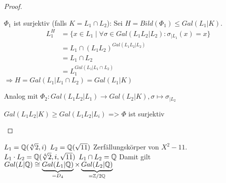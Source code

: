 \documentclass[../main.tex]{subfiles}
\begin{document}
\begin{proof}
\begin{description}
        $\Phi_1$ ist surjektiv (falls $K = L_1 \cap L_2$):
        Sei $H=Bild(\Phi_1)\leq Gal(L_1|K)$.
        \begin{align*}
            L_1^H&=\{x\in L_1\mid\forall \sigma\in Gal(L_1L_2|L_2)\colon \sigma_{|L_1}(x) = x\}\\
            &= L_1\cap (L_1L_2)^{Gal(L_1L_2|L_2)}\\
            &= L_1\cap L_2\\
            &= L_1^{Gal(L_1|L_1\cap L_2)}
        \end{align*}
         $\Rightarrow H= Gal(L_1|L_1\cap L_2) = Gal(L_1|K)$
    
        Analog mit $\Phi_2: Gal(L_1L_2|L_1)\rightarrow Gal(L_2|K), \sigma \mapsto \sigma_{|L_2}$
    
        $Gal(L_1L_2|K)\geq Gal(L_1L_2|L_i)$ => $\Phi$ ist surjektiv
    \end{description}
\end{proof}
\begin{example}
    $L_1=\mathbb{Q}(\sqrt[4]{2},i)$
    $L_2=\mathbb{Q}(\sqrt{11})$ Zerfällungskörper von $X^2-11$.
    $L_1\cdot L_2 = \mathbb{Q}(\sqrt[4]{2},i,\sqrt{11})$
    $L_1\cap L_2 = \mathbb{Q}$
    Damit gilt $Gal(L|\mathbb{Q})\cong \underbrace{Gal(L_1|\mathbb{Q})}_{=D_4}\times \underbrace{Gal(L_2|\mathbb{Q})}_{=\mathbb{Z}/2\mathbb{Q}}$
\end{example}
\end{document}
